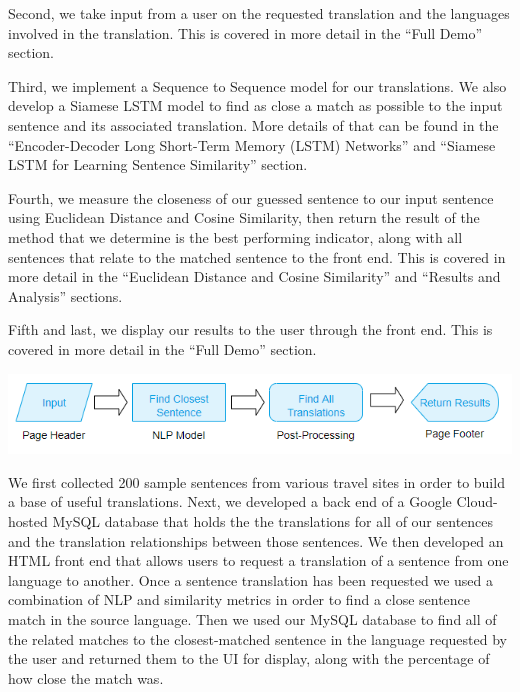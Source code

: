 \documentclass[runningheads]{llncs}
\begin{document}
	Second, we take input from a user on the requested translation and the languages involved in the translation. This is covered in more detail in the ``Full Demo'' section. 
	
	Third, we  implement a Sequence to Sequence model for our translations. We also develop a Siamese LSTM model to find as close a match as possible to the input sentence and its associated translation.  More details of that can be found in the  ``Encoder-Decoder Long Short-Term Memory (LSTM) Networks''  and ``Siamese LSTM for Learning Sentence Similarity'' section. 
	
	Fourth, we measure the closeness of our guessed sentence to our input sentence using Euclidean Distance and Cosine Similarity, then return the result of the method that we determine is the best performing indicator, along with all sentences that relate to the matched sentence to the front end. This is covered in more detail in the ``Euclidean Distance and Cosine Similarity'' and ``Results and Analysis'' sections.
	
	Fifth and last, we display our results to the user through the front end. This is covered in more detail in the ``Full Demo'' section.


	\begin{minipage}{\linewidth}
		\begin{center}
			\hspace*{-.3in}
			\hspace*{-.3in}
			\includegraphics[width=\textwidth]{Process_Map.png}
			\label{fig:Process Map}
			\vspace*{1cm}
		\end{center}
	\end{minipage}
	\afterpage{\clearpage}
	

	
	We first collected 200 sample sentences from various travel sites in order to build a base of useful translations. Next, we developed a back end of a Google Cloud-hosted MySQL database that holds the the translations for all of our sentences and the translation relationships between those sentences. We then developed an HTML front end that allows users to request a translation of a sentence from one language to another. Once a sentence translation has been requested we used a combination of NLP and similarity metrics in order to find a close sentence match in the source language. Then we used our MySQL database to find all of the related matches to the closest-matched sentence in the language requested by the user and returned them to the UI for display, along with the percentage of how close the match was. 
\end{document}
